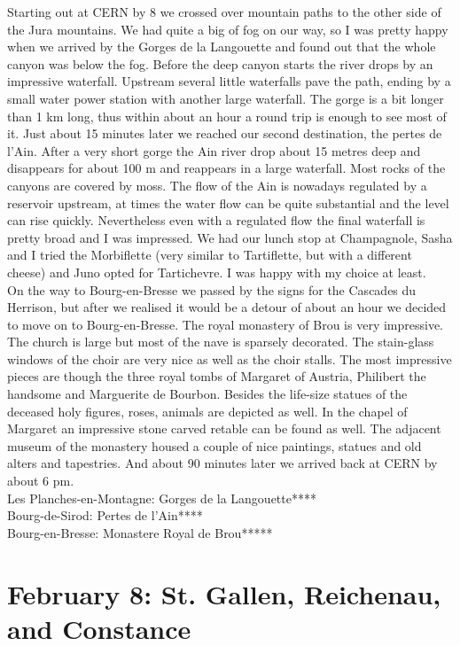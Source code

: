 Starting out at CERN by 8 we crossed over mountain paths to the other side of the Jura mountains. We had quite a big of fog on our way, so I was pretty happy when we arrived by the Gorges de la Langouette and found out that the whole canyon was below the fog. Before the deep canyon starts the river drops by an impressive waterfall. Upstream several little waterfalls pave the path, ending by a small water power station with another large waterfall. The gorge is a bit longer than 1 km long, thus within about an hour a round trip is enough to see most of it. Just about 15 minutes later we reached our second destination, the pertes de l'Ain. After a very short gorge the Ain river drop about 15 metres deep and disappears for about 100 m and reappears in a large waterfall. Most rocks of the canyons are covered by moss. The flow of the Ain is nowadays regulated by a reservoir upstream, at times the water flow can be quite substantial and the level can rise quickly. Nevertheless even with a regulated flow the final waterfall is pretty broad and I was impressed. We had our lunch stop at Champagnole, Sasha and I tried the Morbiflette (very similar to Tartiflette, but with a different cheese) and Juno opted for Tartichevre. I was happy with my choice at least.\\
 On the way to Bourg-en-Bresse we passed by the signs for the Cascades du Herrison, but after we realised it would be a detour of about an hour we decided to move on to Bourg-en-Bresse. The royal monastery of Brou is very impressive. The church is large but most of the nave is sparsely decorated. The stain-glass windows of the choir are very nice as well as the choir stalls. The most impressive pieces are though the three royal tombs of Margaret of Austria, Philibert the handsome and Marguerite de Bourbon. Besides the life-size statues of the deceased holy figures, roses, animals are depicted as well. In the chapel of Margaret an impressive stone carved retable can be found as well. The adjacent museum of the monastery housed a couple of nice paintings, statues and old alters and tapestries. And about 90 minutes later we arrived back at CERN by about 6 pm.\\ 

Les Planches-en-Montagne: Gorges de la Langouette****\\
Bourg-de-Sirod: Pertes de l'Ain****\\
Bourg-en-Bresse: Monastere Royal de Brou*****\\

\section{February 8: St. Gallen, Reichenau, and Constance}
\label{2020:Reichenau}

